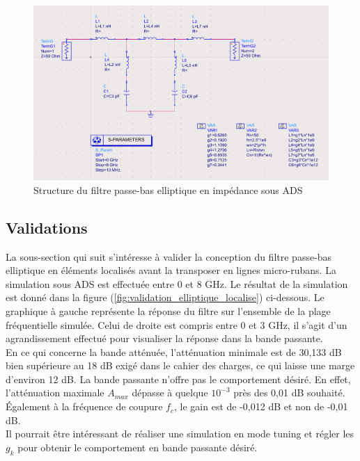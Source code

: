 \documentclass[french]{article}
\begin{document}
\begin{figure}[H]
	\centering
	\includegraphics[width=12cm]{../3synthPBas/elliptique/modele_ADS_elliptique.png}
	\caption{Structure du filtre passe-bas elliptique en impédance sous ADS}
	\label{fig:montage_ADS_elliptique}
\end{figure}

\newpage

\subsection*{Validations}

La sous-section qui suit s'intéresse à valider la conception du filtre passe-bas elliptique en éléments localisés avant la transposer en lignes micro-rubans. La simulation sous ADS est effectuée entre 0 et 8 GHz. Le résultat de la simulation est donné dans la figure (\ref{fig:validation_elliptique_localise}) ci-dessous. Le graphique à gauche représente la réponse du filtre sur l'ensemble de la plage fréquentielle simulée. Celui de droite est compris entre 0 et 3 GHz, il s'agit d'un agrandissement effectué pour visualiser la réponse dans la bande passante.\\
En ce qui concerne la bande atténuée, l'atténuation minimale est de 30,133 dB bien supérieure au 18 dB exigé dans le cahier des charges, ce qui laisse une marge d'environ 12 dB. La bande passante n'offre pas le comportement désiré. En effet, l'atténuation maximale $A_{max}$ dépasse à quelque $10^{-3}$ près des 0,01 dB souhaité. Également à la fréquence de coupure $f_c$, le gain est de -0,012 dB et non de -0,01 dB.\\
Il pourrait être intéressant de réaliser une simulation en mode tuning et régler les $g_k$ pour obtenir le comportement en bande passante désiré.
\end{document}
